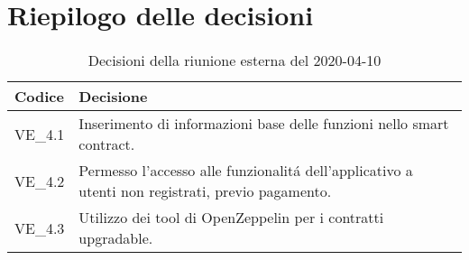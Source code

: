 \section{Riepilogo delle decisioni}
\begin{longtable}{
	 >{\centering}p{} >{}p{} }
	\caption{Decisioni della riunione esterna del 2020-04-10}\\

	\textbf{\color{white}Codice} &
	\textbf{\color{white}Decisione}
	\tabularnewline
	\endhead

	VE\_4.1 & Inserimento di informazioni base delle funzioni nello smart contract. \\
	VE\_4.2 & Permesso l'accesso alle funzionalitá dell'applicativo a utenti non registrati, previo pagamento. \\
	VE\_4.3 & Utilizzo dei tool di OpenZeppelin per i contratti upgradable. \\
\end{longtable}
